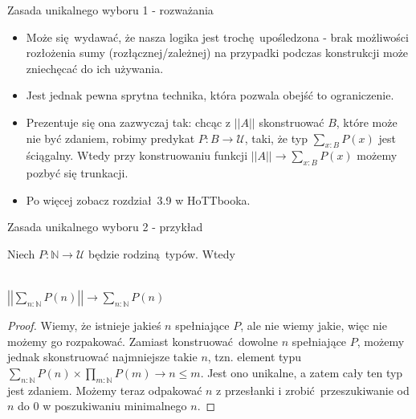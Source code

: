 \documentclass{beamer}
\newcommand{\U}{\mathcal{U}}
\newcommand{\trf}[1]{||#1||}
\begin{document}
\begin{frame}{Zasada unikalnego wyboru 1 - rozważania}
\begin{itemize}
	\item Może się wydawać, że nasza logika jest trochę upośledzona - brak możliwości rozłożenia sumy (rozłącznej/zależnej) na przypadki podczas konstrukcji może zniechęcać do ich używania.
	\item Jest jednak pewna sprytna technika, która pozwala obejść to ograniczenie.
	\item Prezentuje się ona zazwyczaj tak: chcąc z $\trf{A}$ skonstruować $B$, które może nie być zdaniem, robimy predykat $P : B \to \U$, taki, że typ $\sum_{x : B} P(x)$ jest ściągalny. Wtedy przy konstruowaniu funkcji $\trf{A} \to \sum_{x : B} P(x)$ możemy pozbyć się trunkacji.
	\item Po więcej zobacz rozdział 3.9 w HoTTbooka.
\end{itemize}
\end{frame}

\begin{frame}{Zasada unikalnego wyboru 2 - przykład}
	
\begin{theorem}[Zadanie 3.19 i 3.23]
Niech $P : \mathbb{N} \to \U$ będzie rodziną typów. Wtedy \\~\

\begin{center}
$\displaystyle \left|\left|\sum_{n : \mathbb{N}} P(n)\right|\right| \to \sum_{n : \mathbb{N}} P(n)$
\end{center}
\end{theorem}
\begin{proof}
Wiemy, że istnieje jakieś $n$ spełniające $P$, ale nie wiemy jakie, więc nie możemy go rozpakować. Zamiast konstruować dowolne $n$ spełniające $P$, możemy jednak skonstruować najmniejsze takie $n$, tzn. element typu $\sum_{n : \mathbb{N}} P(n) \times \prod_{m : \mathbb{N}} P(m) \to n \leq m$. Jest ono unikalne, a zatem cały ten typ jest zdaniem. Możemy teraz odpakować $n$ z przesłanki i zrobić przeszukiwanie od $n$ do $0$ w poszukiwaniu minimalnego $n$.
\end{proof}

\end{frame}
\end{document}
